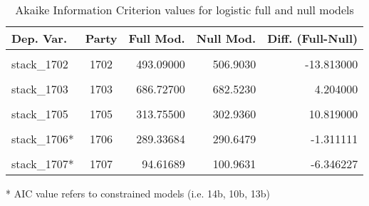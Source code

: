 \documentclass[
]{article}
\begin{document}
\begin{table}[!h]

\caption{\label{tab:unnamed-chunk-113}Akaike Information Criterion values for logistic full and null models 
        \label{table:logit_aic_lt}}
\centering
\begin{threeparttable}
\begin{tabular}[t]{lcrrr}
\toprule
Dep. Var. & Party & Full Mod. & Null Mod. & Diff. (Full-Null)\\
\midrule
\cellcolor{gray!6}{stack\_1701} & \cellcolor{gray!6}{1701} & \cellcolor{gray!6}{716.68400} & \cellcolor{gray!6}{761.3430} & \cellcolor{gray!6}{-44.660000}\\
stack\_1702 & 1702 & 493.09000 & 506.9030 & -13.813000\\
\cellcolor{gray!6}{stack\_1702*} & \cellcolor{gray!6}{1702} & \cellcolor{gray!6}{492.26483} & \cellcolor{gray!6}{506.9028} & \cellcolor{gray!6}{-14.637938}\\
stack\_1703 & 1703 & 686.72700 & 682.5230 & 4.204000\\
\cellcolor{gray!6}{stack\_1704} & \cellcolor{gray!6}{1704} & \cellcolor{gray!6}{166.63600} & \cellcolor{gray!6}{167.1380} & \cellcolor{gray!6}{-0.502000}\\
\addlinespace
stack\_1705 & 1705 & 313.75500 & 302.9360 & 10.819000\\
\cellcolor{gray!6}{stack\_1706} & \cellcolor{gray!6}{1706} & \cellcolor{gray!6}{287.67200} & \cellcolor{gray!6}{290.6480} & \cellcolor{gray!6}{-2.976000}\\
stack\_1706* & 1706 & 289.33684 & 290.6479 & -1.311111\\
\cellcolor{gray!6}{stack\_1707} & \cellcolor{gray!6}{1707} & \cellcolor{gray!6}{96.03700} & \cellcolor{gray!6}{100.9630} & \cellcolor{gray!6}{-4.926000}\\
stack\_1707* & 1707 & 94.61689 & 100.9631 & -6.346227\\
\bottomrule
\end{tabular}
\begin{tablenotes}[para]
\item[*] AIC value refers to constrained models (i.e. 14b, 10b, 13b)
\end{tablenotes}
\end{threeparttable}
\end{table}
\end{document}
